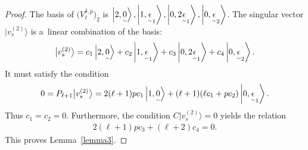 \documentclass[11pt]{article}
\numberwithin{equation}{section}
\newcommand{\underaccent}[2]{\mathord{\underset{\smash{\scriptscriptstyle\sim}}{#2}}}
\def\ket#1{\left| #1\right\rangle}
\begin{document}
\begin{proof}
The basis of $ \big(V^{\delta,p}_{\ell}\big)_2 $ is $ \ket{2,\underaccent{\tilde}{0}}, \ket{1,\underaccent{\tilde}{\epsilon}_1},
\ket{0,2\underaccent{\tilde}{\epsilon}_1}, \ket{0,\underaccent{\tilde}{\epsilon}_2}$.
The singular vector $ \big|v_s^{(2)}\big\rangle$ is a~linear combination of the basis:
\begin{gather*}
\big|v_s^{(2)}\big\rangle  = c_1 \ket{2,\underaccent{\tilde}{0}} + c_2 \ket{1,\underaccent{\tilde}{\epsilon}_1} + c_3
\ket{0,2\underaccent{\tilde}{\epsilon}_1} + c_4 \ket{0,\underaccent{\tilde}{\epsilon}_2}.
\end{gather*}
It must satisfy the condition
\begin{gather*}
0 = P_{\ell+1} \big|v_s^{(2)}\big\rangle  = 2 (\ell+1)  p   c_1 \ket{1,\underaccent{\tilde}{0}} + (\ell+1)   (\ell  c_1 + p
c_2) \ket{0,\underaccent{\tilde}{\epsilon}_1}.
\end{gather*}
Thus $ c_1 = c_2 = 0$.
Furthermore, the condition $ C \big|v_s^{(2)}\big\rangle  = 0 $ yields the relation
\begin{gather*}
2 (\ell+1)   p   c_3 + (\ell+2) c_4 = 0.
\end{gather*}
This proves Lemma~\ref{lemma3}.
\end{proof}
\end{document}
